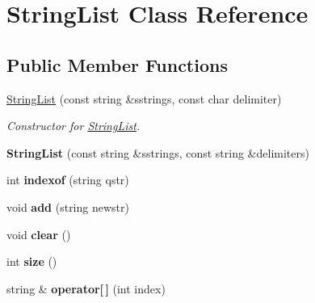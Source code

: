 \hypertarget{classStringList}{
\section{StringList Class Reference}
\label{classStringList}
}
\subsection*{Public Member Functions}
\begin{DoxyCompactItemize}
\item 
\hypertarget{classStringList_a0e2782b895540a5d7ccbc3bb2b9defa6}{
\hyperlink{classStringList_a0e2782b895540a5d7ccbc3bb2b9defa6}{StringList} (const string \&sstrings, const char delimiter)}
\label{classStringList_a0e2782b895540a5d7ccbc3bb2b9defa6}

\begin{DoxyCompactList}\small\item\em Constructor for \hyperlink{classStringList}{StringList}. \end{DoxyCompactList}\item 
\hypertarget{classStringList_aab2b9be958fdd8ef37f576bc6950deb6}{
{\bfseries StringList} (const string \&sstrings, const string \&delimiters)}
\label{classStringList_aab2b9be958fdd8ef37f576bc6950deb6}

\item 
\hypertarget{classStringList_ad362163892d7242e8db461dfc7af52f4}{
int {\bfseries indexof} (string qstr)}
\label{classStringList_ad362163892d7242e8db461dfc7af52f4}

\item 
\hypertarget{classStringList_aeec14f49deaaa845deed7886cf7f1d4b}{
void {\bfseries add} (string newstr)}
\label{classStringList_aeec14f49deaaa845deed7886cf7f1d4b}

\item 
\hypertarget{classStringList_a5ad2ccbfc0d55ebd1239af8dfa687abe}{
void {\bfseries clear} ()}
\label{classStringList_a5ad2ccbfc0d55ebd1239af8dfa687abe}

\item 
\hypertarget{classStringList_a7839bcac8a6d8329905dfca91db7894d}{
int {\bfseries size} ()}
\label{classStringList_a7839bcac8a6d8329905dfca91db7894d}

\item 
\hypertarget{classStringList_a59190def5b922a7093538dfd4b87c959}{
string \& {\bfseries operator\mbox{[}$\,$\mbox{]}} (int index)}
\label{classStringList_a59190def5b922a7093538dfd4b87c959}


\end{DoxyCompactItemize}
